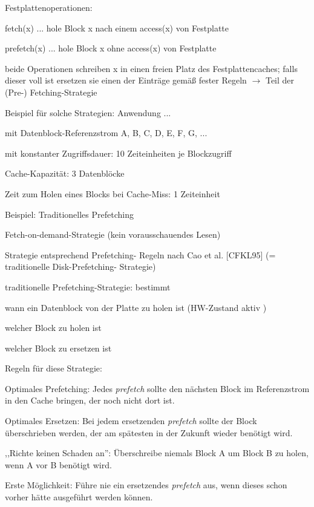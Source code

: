 \documentclass[a4paper]{article}
\begin{document}
\begin{multicols}{3}
\begin{itemize*}
        Festplattenoperationen:
        \begin{itemize*}
            \item fetch(x) ... hole Block x nach einem access(x) von Festplatte
            \item prefetch(x) ... hole Block x ohne access(x) von Festplatte
            \item beide Operationen schreiben x in einen freien Platz des Festplattencaches; falls dieser voll ist ersetzen sie einen der Einträge gemäß fester Regeln $\rightarrow$  Teil der (Pre-) Fetching-Strategie
        \end{itemize*}
        \item
        Beispiel für solche Strategien: Anwendung ...
        \begin{itemize*}
            \item mit Datenblock-Referenzstrom A, B, C, D, E, F, G, ...
            \item mit konstanter Zugriffsdauer: 10 Zeiteinheiten je Blockzugriff
            \item Cache-Kapazität: 3 Datenblöcke
            \item Zeit zum Holen eines Blocks bei Cache-Miss: 1 Zeiteinheit
        \end{itemize*}
        \item
        Beispiel: Traditionelles Prefetching
        \begin{itemize*}
            \item Fetch-on-demand-Strategie (kein vorausschauendes Lesen)
            \item Strategie entsprechend Prefetching- Regeln nach Cao et al. {[}CFKL95{]} (= traditionelle Disk-Prefetching- Strategie)
            \item traditionelle Prefetching-Strategie: bestimmt \begin{itemize*} \item   wann ein Datenblock von der Platte zu holen ist (HW-Zustand aktiv   ) \item   welcher Block zu holen ist \item   welcher Block zu ersetzen ist \end{itemize*}
            \item Regeln für diese Strategie: \begin{enumerate*}  \item   Optimales Prefetching: Jedes \emph{prefetch} sollte den nächsten   Block im Referenzstrom in den Cache bringen, der noch nicht dort   ist. \item   Optimales Ersetzen: Bei jedem ersetzenden \emph{prefetch} sollte   der Block überschrieben werden, der am spätesten in der Zukunft   wieder benötigt wird. \item   ,,Richte keinen Schaden an'': Überschreibe niemals Block A um   Block B zu holen, wenn A vor B benötigt wird. \item   Erste Möglichkeit: Führe nie ein ersetzendes \emph{prefetch} aus,   wenn dieses schon vorher hätte ausgeführt werden können. \end{enumerate*}

\end{itemize*}
\end{itemize*}
\end{multicols}
\end{document}
